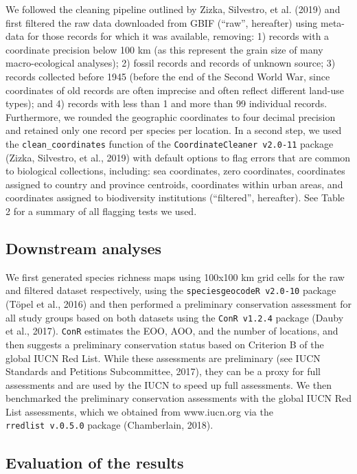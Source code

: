 \documentclass[
  12pt,
]{article}
\begin{document}
We followed the cleaning pipeline outlined by Zizka, Silvestro, et al. (2019) and first filtered the raw data downloaded from GBIF (``raw'', hereafter) using meta-data for those records for which it was available, removing: 1) records with a coordinate precision below 100 km (as this represent the grain size of many macro-ecological analyses); 2) fossil records and records of unknown source; 3) records collected before 1945 (before the end of the Second World War, since coordinates of old records are often imprecise and often reflect different land-use types); and 4) records with less than 1 and more than 99 individual records. Furthermore, we rounded the geographic coordinates to four decimal precision and retained only one record per species per location. In a second step, we used the \texttt{clean\_coordinates} function of the \texttt{CoordinateCleaner\ v2.0-11} package (Zizka, Silvestro, et al., 2019) with default options to flag errors that are common to biological collections, including: sea coordinates, zero coordinates, coordinates assigned to country and province centroids, coordinates within urban areas, and coordinates assigned to biodiversity institutions (``filtered'', hereafter). See Table 2 for a summary of all flagging tests we used.

\hypertarget{downstream-analyses}{%
\subsection{Downstream analyses}\label{downstream-analyses}}

We first generated species richness maps using 100x100 km grid cells for the raw and filtered dataset respectively, using the \texttt{speciesgeocodeR\ v2.0-10} package (Töpel et al., 2016) and then performed a preliminary conservation assessment for all study groups based on both datasets using the \texttt{ConR\ v1.2.4} package (Dauby et al., 2017). \texttt{ConR} estimates the EOO, AOO, and the number of locations, and then suggests a preliminary conservation status based on Criterion B of the global IUCN Red List. While these assessments are preliminary (see IUCN Standards and Petitions Subcommittee, 2017), they can be a proxy for full assessments and are used by the IUCN to speed up full assessments. We then benchmarked the preliminary conservation assessments with the global IUCN Red List assessments, which we obtained from www.iucn.org via the \texttt{rredlist\ v.0.5.0} package (Chamberlain, 2018).

\hypertarget{evaluation-of-the-results}{%
\subsection{Evaluation of the results}\label{evaluation-of-the-results}}
\end{document}
